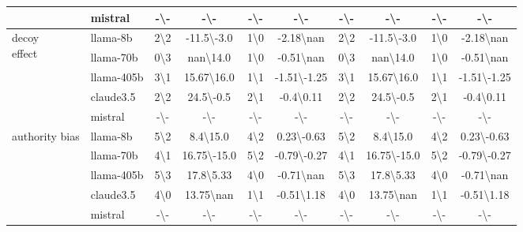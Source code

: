 \begin{table*}[ht!]
\begin{sc}
\begin{tabular}{l|l|cc|cc|cc|cc}
 & mistral & -\textbackslash- & -\textbackslash- & -\textbackslash- & -\textbackslash- & -\textbackslash- & -\textbackslash- & -\textbackslash- & -\textbackslash-\\
\midrule
\multirow{5}{*}{\parbox{1.8cm}{decoy \\effect}} & llama-8b & 2\textbackslash2 & -11.5\textbackslash-3.0 & 1\textbackslash0 & -2.18\textbackslash nan & 2\textbackslash2 & -11.5\textbackslash-3.0 & 1\textbackslash0 & -2.18\textbackslash nan\\
 & llama-70b & 0\textbackslash3 & nan\textbackslash14.0 & 1\textbackslash0 & -0.51\textbackslash nan & 0\textbackslash3 & nan\textbackslash14.0 & 1\textbackslash0 & -0.51\textbackslash nan\\
 & llama-405b & 3\textbackslash1 & 15.67\textbackslash16.0 & 1\textbackslash1 & -1.51\textbackslash-1.25 & 3\textbackslash1 & 15.67\textbackslash16.0 & 1\textbackslash1 & -1.51\textbackslash-1.25\\
 & claude3.5 & 2\textbackslash2 & 24.5\textbackslash-0.5 & 2\textbackslash1 & -0.4\textbackslash0.11 & 2\textbackslash2 & 24.5\textbackslash-0.5 & 2\textbackslash1 & -0.4\textbackslash0.11\\
 & mistral & -\textbackslash- & -\textbackslash- & -\textbackslash- & -\textbackslash- & -\textbackslash- & -\textbackslash- & -\textbackslash- & -\textbackslash-\\
\midrule
\multirow{5}{*}{\parbox{1.8cm}{authority bias}} & llama-8b & 5\textbackslash2 & 8.4\textbackslash15.0 & 4\textbackslash2 & 0.23\textbackslash-0.63 & 5\textbackslash2 & 8.4\textbackslash15.0 & 4\textbackslash2 & 0.23\textbackslash-0.63\\
 & llama-70b & 4\textbackslash1 & 16.75\textbackslash-15.0 & 5\textbackslash2 & -0.79\textbackslash-0.27 & 4\textbackslash1 & 16.75\textbackslash-15.0 & 5\textbackslash2 & -0.79\textbackslash-0.27\\
 & llama-405b & 5\textbackslash3 & 17.8\textbackslash5.33 & 4\textbackslash0 & -0.71\textbackslash nan & 5\textbackslash3 & 17.8\textbackslash5.33 & 4\textbackslash0 & -0.71\textbackslash nan\\
 & claude3.5 & 4\textbackslash0 & 13.75\textbackslash nan & 1\textbackslash1 & -0.51\textbackslash1.18 & 4\textbackslash0 & 13.75\textbackslash nan & 1\textbackslash1 & -0.51\textbackslash1.18\\
 & mistral & -\textbackslash- & -\textbackslash- & -\textbackslash- & -\textbackslash- & -\textbackslash- & -\textbackslash- & -\textbackslash- & -\textbackslash-\\

\end{tabular}
\end{sc}
\end{table*}
